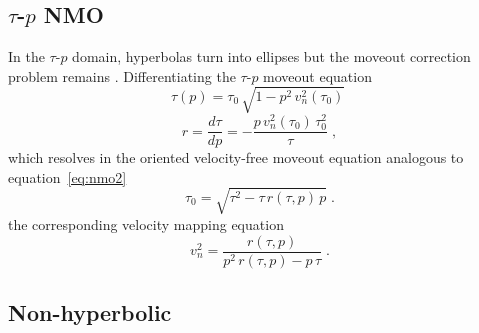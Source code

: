 \subsection{$\tau$-$p$ NMO}

  In
  the $\tau$-$p$ domain, hyperbolas turn into ellipses but the moveout
  correction problem remains
  \cite[]{GEO46-03-02550267}. Differentiating the $\tau$-$p$ moveout
  equation
\begin{equation}
  \label{eq:taup}
  \tau(p) = \tau_0\,\sqrt{1 - p^2\,v_n^2(\tau_0)}\;
\end{equation}
 
\begin{equation}
  \label{eq:dtaup}
  r = \frac{d \tau}{d p} = - \frac{p\,v_n^2(\tau_0)\,\tau_0^2}{\tau}\;,
\end{equation}
which resolves in the oriented velocity-free moveout equation analogous to
equation~\ref{eq:nmo2}
\begin{equation}
  \label{eq:taupmo}
  \tau_0 = \sqrt{\tau^2 - \tau\,r(\tau,p)\,p}\;.
\end{equation}
 the
corresponding velocity mapping equation 
\begin{equation}
  \label{eq:taupvel}
  v_n^2 = \frac{r(\tau,p)}{p^2\,r(\tau,p) - p\,\tau}\;.
\end{equation}

\subsection{Non-hyperbolic  }

\nocite{Sword.sep.51.313}

